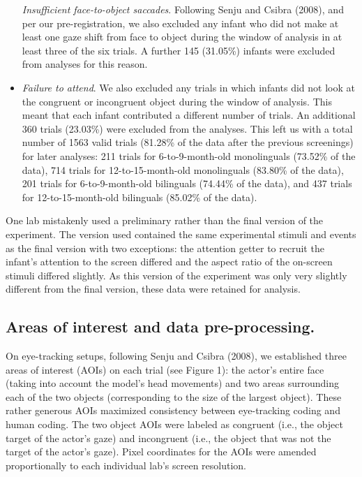 \documentclass[,man,floatsintext]{apa6}
\begin{document}
\begin{itemize}
  \emph{Insufficient face-to-object saccades}. Following Senju and Csibra (2008), and per our pre-registration, we also excluded any infant who did not make at least one gaze shift from face to object during the window of analysis in at least three of the six trials. A further 145 (31.05\%) infants were excluded from analyses for this reason.
\item
  \emph{Failure to attend}. We also excluded any trials in which infants did not look at the congruent or incongruent object during the window of analysis. This meant that each infant contributed a different number of trials. An additional 360 trials (23.03\%) were excluded from the analyses. This left us with a total number of 1563 valid trials (81.28\% of the data after the previous screenings) for later analyses: 211 trials for 6-to-9-month-old monolinguals (73.52\% of the data), 714 trials for 12-to-15-month-old monolinguals (83.80\% of the data), 201 trials for 6-to-9-month-old bilinguals (74.44\% of the data), and 437 trials for 12-to-15-month-old bilinguals (85.02\% of the data).
\end{itemize}

One lab mistakenly used a preliminary rather than the final version of the experiment. The version used contained the same experimental stimuli and events as the final version with two exceptions: the attention getter to recruit the infant's attention to the screen differed and the aspect ratio of the on-screen stimuli differed slightly. As this version of the experiment was only very slightly different from the final version, these data were retained for analysis.

\hypertarget{areas-of-interest-and-data-pre-processing.}{%
\subsection{Areas of interest and data pre-processing.}\label{areas-of-interest-and-data-pre-processing.}}

On eye-tracking setups, following Senju and Csibra (2008), we established three areas of interest (AOIs) on each trial (see Figure 1): the actor's entire face (taking into account the model's head movements) and two areas surrounding each of the two objects (corresponding to the size of the largest object). These rather generous AOIs maximized consistency between eye-tracking coding and human coding. The two object AOIs were labeled as congruent (i.e., the object target of the actor's gaze) and incongruent (i.e., the object that was not the target of the actor's gaze). Pixel coordinates for the AOIs were amended proportionally to each individual lab's screen resolution.
\end{document}
